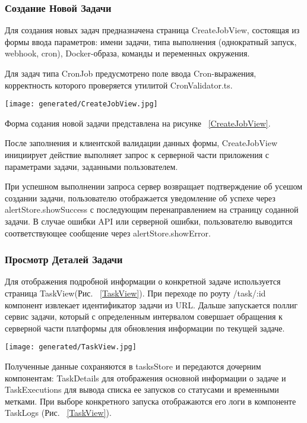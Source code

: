 \subsubsection{Создание Новой Задачи}

Для создания новых задач предназначена страница CreateJobView, состоящая из формы ввода параметров: имени задачи, типа выполнения (однократный запуск, webhook, cron), Docker-образа, команды и переменных окружения.

Для задач типа CronJob предусмотрено поле ввода Cron-выражения, корректность которого проверяется утилитой CronValidator.ts.

\begin{figure*}[!t]
  \centering
  \texttt{[image: generated/CreateJobView.jpg]}
  \caption{Форма создания новой задачи}
  \label{CreateJobView}
\end{figure*}

Форма содания новой задачи представлена на рисунке ~\ref{CreateJobView}.

После заполнения и клиентской валидации данных формы, CreateJobView инициирует действие выполняет запрос к серверной части приложения с параметрами задачи, заданными пользователем.

При успешном выполнении запроса сервер возвращает подтверждение об усешом создании задачи, пользователю отображается уведомление об успехе через alertStore.showSuccess с последующим перенаправлением на страницу соданной задачи. В случае ошибки API или серверной ошибки, пользователю выводится соответствующее сообщение через alertStore.showError.

\subsubsection{Просмотр Деталей Задачи}

Для отображения подробной информации о конкретной задаче используется страница TaskView(Рис. ~\ref{TaskView}). При переходе по роуту /task/:id компонент извлекает идентификатор задачи из URL. Дальше запускается поллиг сервис задачи, который с определенным интервалом совершает обращения к серверной части платформы для обновления информации по текущей задаче.

\begin{figure*}[!t]
  \centering
  \texttt{[image: generated/TaskView.jpg]}
  \caption{Экран задачи}
  \label{TaskView}
\end{figure*}

Полученные данные сохраняются в tasksStore и передаются дочерним компонентам: TaskDetails для отображения основной информации о задаче и TaskExecutions для вывода списка ее запусков со статусами и временными метками. При выборе конкретного запуска отображаются его логи в компоненте TaskLogs (Рис. ~\ref{TaskView}).

